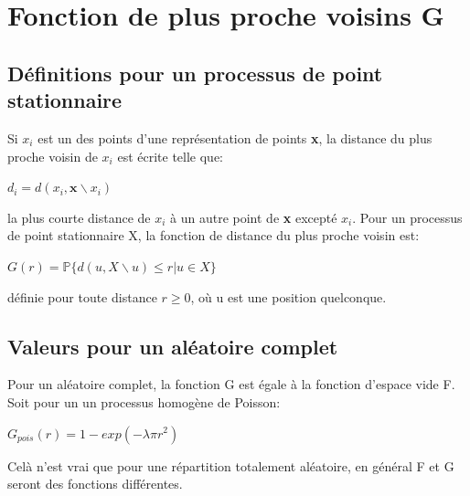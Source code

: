 \documentclass[french,12pt,a4paper]{report}
\begin{document}

\section{Fonction de plus proche voisins G}

\subsection{Définitions pour un processus de point stationnaire}
Si \begin{math}x_i\end{math} est un des points d'une représentation de points \textbf{x}, la distance du plus proche voisin de  \begin{math}x_i\end{math} est écrite telle que:
\begin{center}\begin{math} d_i = d(x_i,\textbf{x}\backslash x_i ) \end{math}\end{center}
la plus courte distance de \begin{math} x_i \end{math} à un autre point de \textbf{x} excepté \begin{math} x_i \end{math}.
Pour un processus de point stationnaire X, la fonction de distance du plus proche voisin est:
\begin{center}\begin{math} G(r) = \mathbb{P}\{ d(u,X\backslash u) \leq r | u \in X\} \end{math}\end{center}
définie pour toute distance \begin{math} r \geq 0 \end{math}, où u est une position quelconque.\\


\subsection{Valeurs pour un aléatoire complet}

Pour un aléatoire complet, la fonction G est égale à la fonction d'espace vide F. Soit pour un un processus homogène de Poisson: 
\begin{center}\begin{math} G_{pois}(r) = 1 - exp(-\lambda \pi r^2) \end{math}\end{center}
Celà n'est vrai que pour une répartition totalement aléatoire, en général F et G seront des fonctions différentes.\\
\end{document}
